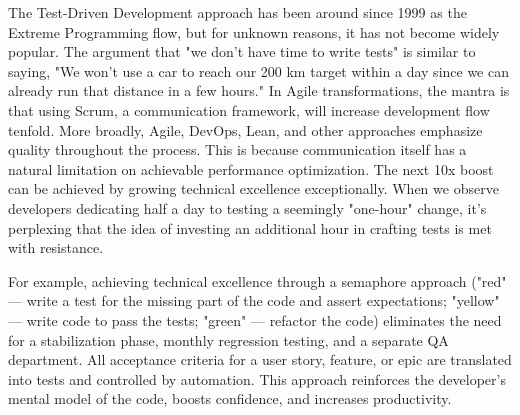 The Test-Driven Development approach has been around since 1999 as the Extreme Programming flow, but for unknown 
reasons, it has not become widely popular. The argument that "we don't have time to write tests" is similar to saying, 
"We won't use a car to reach our 200 km target within a day since we can already run that distance in a few hours." In 
Agile transformations, the mantra is that using Scrum, a communication framework, will increase development flow 
tenfold. More broadly, Agile, DevOps, Lean, and other approaches emphasize quality throughout the process. This is 
because communication itself has a natural limitation on achievable performance optimization. The next 10x boost can be 
achieved by growing technical excellence exceptionally. When we observe developers dedicating half a day to testing a 
seemingly "one-hour" change, it's perplexing that the idea of investing an additional hour in crafting tests is met with 
resistance.

For example, achieving technical excellence through a semaphore approach ("red" — write a test for the missing part of 
the code and assert expectations; "yellow" — write code to pass the tests; "green" — refactor the code) eliminates the 
need for a stabilization phase, monthly regression testing, and a separate QA department. All acceptance criteria for a 
user story, feature, or epic are translated into tests and controlled by automation. This approach reinforces the 
developer's mental model of the code, boosts confidence, and increases productivity.
